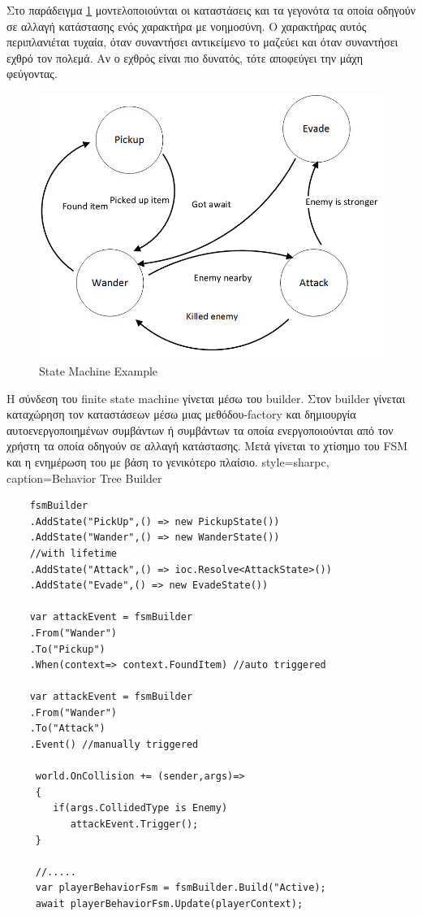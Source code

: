 Στο παράδειγμα \ref{fig:state_machine_example} μοντελοποιούνται οι καταστάσεις και τα γεγονότα τα οποία οδηγούν σε αλλαγή κατάστασης ενός χαρακτήρα με νοημοσύνη. Ο χαρακτήρας αυτός περιπλανιέται τυχαία, όταν συναντήσει αντικείμενο το μαζεύει και όταν συναντήσει εχθρό τον πολεμά. Αν ο εχθρός είναι πιο δυνατός, τότε αποφεύγει την μάχη φεύγοντας.
\begin{figure}[h!]
	\centering
	\includegraphics[width=165mm]{Images/ingame_fsm_example}
	\caption{State Machine Example}
	\label{fig:state_machine_example}
\end{figure}

H σύνδεση του finite state machine γίνεται μέσω του builder. Στον builder γίνεται καταχώρηση τον καταστάσεων μέσω μιας μεθόδου-factory και δημιουργία αυτοενεργοποιημένων συμβάντων ή συμβάντων τα οποία ενεργοποιούνται από τον χρήστη τα οποία οδηγούν σε αλλαγή κατάστασης. Μετά γίνεται το χτίσημο του FSM και η ενημέρωση του με βάση το γενικότερο πλαίσιο.
	\lstset
	{
		style=sharpc, 
		caption={Behavior Tree Builder}
	}
	\begin{lstlisting}	
	fsmBuilder
	.AddState("PickUp",() => new PickupState())
	.AddState("Wander",() => new WanderState())
	//with lifetime
	.AddState("Attack",() => ioc.Resolve<AttackState>())
	.AddState("Evade",() => new EvadeState())	
		
	var attackEvent = fsmBuilder
	.From("Wander")
	.To("Pickup")
	.When(context=> context.FoundItem) //auto triggered
	
	var attackEvent = fsmBuilder
    .From("Wander")
	.To("Attack")
	.Event() //manually triggered
	 	
	 world.OnCollision += (sender,args)=>
	 {
	    if(args.CollidedType is Enemy)
	       attackEvent.Trigger();
	 }
	 
	 //.....	 
  	 var playerBehaviorFsm = fsmBuilder.Build("Active);
	 await playerBehaviorFsm.Update(playerContext);
	
	\end{lstlisting}
